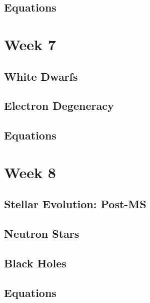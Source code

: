 \documentclass[a4paper,10pt]{article}
\begin{document}
\subsection{Equations}

 

\newpage
\section{Week 7}

\subsection{White Dwarfs}

\subsection{Electron Degeneracy}

\subsection{Equations}

\newpage
\section{Week 8}

\subsection{Stellar Evolution: Post-MS}

\subsection{Neutron Stars}

\subsection{Black Holes}

\subsection{Equations}
\end{document}
